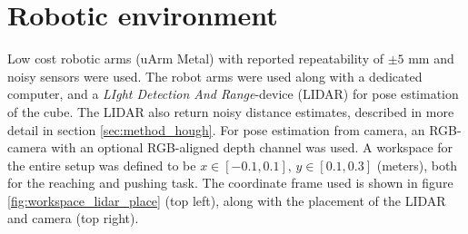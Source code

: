 \section{Robotic environment}
\label{sec:robo_env}

Low cost robotic arms (uArm Metal) with reported repeatability of $\pm 5$ mm
and noisy sensors were used. The robot arms were used along with a dedicated
computer, and a \textit{LIght Detection And Range}-device (LIDAR) for pose
estimation of the cube. The LIDAR also return noisy distance estimates,
described in more detail in section \ref{sec:method_hough}. For pose estimation
from camera, an RGB-camera with an optional RGB-aligned depth channel was used.
A workspace for the entire setup was defined to be $x \in [-0.1, 0.1]$, $y \in
[0.1, 0.3]$ (meters), both for the reaching and pushing task. The coordinate
frame used is shown in figure \ref{fig:workspace_lidar_place} (top left), along
with the placement of the LIDAR and camera (top right).

